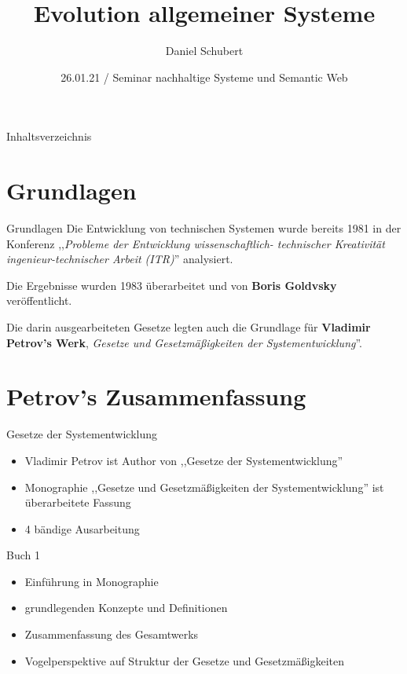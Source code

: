 \documentclass{beamer}
\title[Evolution allgemeiner Systeme]{Evolution allgemeiner Systeme}
\author{Daniel Schubert}
\date{26.01.21 / Seminar nachhaltige Systeme und Semantic Web}
\begin{document}
\begin{frame}
  \titlepage
\end{frame}

\begin{frame}{Inhaltsverzeichnis}
  \tableofcontents
\end{frame}

\section{Grundlagen}
\begin{frame}{Grundlagen}
Die Entwicklung von technischen Systemen wurde bereits 1981 in der Konferenz ,,\emph{Probleme der Entwicklung wissenschaftlich- technischer Kreativität ingenieur-technischer Arbeit (ITR)}'' analysiert. \medskip

Die Ergebnisse wurden 1983 überarbeitet und von \textbf{Boris Goldvsky} veröffentlicht. \medskip

Die darin ausgearbeiteten Gesetze legten auch die Grundlage für \textbf{Vladimir Petrov's Werk}, \emph{Gesetze und Gesetzmäßigkeiten der Systementwicklung}''. \medskip

\end{frame}


\section{Petrov's Zusammenfassung}
\begin{frame}{Gesetze der Systementwicklung}
\begin{itemize}
\item Vladimir Petrov ist Author von ,,Gesetze der Systementwicklung''
\item Monographie ,,Gesetze und Gesetzmäßigkeiten der Systementwicklung'' ist überarbeitete Fassung
\item 4 bändige Ausarbeitung
\end{itemize}

\end{frame}

\begin{frame}{Buch 1}
\begin{itemize}
\item Einführung in Monographie
\item grundlegenden Konzepte und Definitionen
\item Zusammenfassung des Gesamtwerks
\item Vogelperspektive auf Struktur der Gesetze und Gesetzmäßigkeiten
\end{itemize}
\end{frame}
\end{document}
